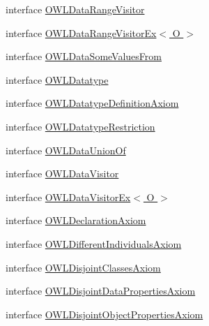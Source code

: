\begin{DoxyCompactItemize}
\item 
interface \hyperlink{interfaceorg_1_1semanticweb_1_1owlapi_1_1model_1_1_o_w_l_data_range_visitor}{O\-W\-L\-Data\-Range\-Visitor}
\item 
interface \hyperlink{interfaceorg_1_1semanticweb_1_1owlapi_1_1model_1_1_o_w_l_data_range_visitor_ex_3_01_o_01_4}{O\-W\-L\-Data\-Range\-Visitor\-Ex$<$ O $>$}
\item 
interface \hyperlink{interfaceorg_1_1semanticweb_1_1owlapi_1_1model_1_1_o_w_l_data_some_values_from}{O\-W\-L\-Data\-Some\-Values\-From}
\item 
interface \hyperlink{interfaceorg_1_1semanticweb_1_1owlapi_1_1model_1_1_o_w_l_datatype}{O\-W\-L\-Datatype}
\item 
interface \hyperlink{interfaceorg_1_1semanticweb_1_1owlapi_1_1model_1_1_o_w_l_datatype_definition_axiom}{O\-W\-L\-Datatype\-Definition\-Axiom}
\item 
interface \hyperlink{interfaceorg_1_1semanticweb_1_1owlapi_1_1model_1_1_o_w_l_datatype_restriction}{O\-W\-L\-Datatype\-Restriction}
\item 
interface \hyperlink{interfaceorg_1_1semanticweb_1_1owlapi_1_1model_1_1_o_w_l_data_union_of}{O\-W\-L\-Data\-Union\-Of}
\item 
interface \hyperlink{interfaceorg_1_1semanticweb_1_1owlapi_1_1model_1_1_o_w_l_data_visitor}{O\-W\-L\-Data\-Visitor}
\item 
interface \hyperlink{interfaceorg_1_1semanticweb_1_1owlapi_1_1model_1_1_o_w_l_data_visitor_ex_3_01_o_01_4}{O\-W\-L\-Data\-Visitor\-Ex$<$ O $>$}
\item 
interface \hyperlink{interfaceorg_1_1semanticweb_1_1owlapi_1_1model_1_1_o_w_l_declaration_axiom}{O\-W\-L\-Declaration\-Axiom}
\item 
interface \hyperlink{interfaceorg_1_1semanticweb_1_1owlapi_1_1model_1_1_o_w_l_different_individuals_axiom}{O\-W\-L\-Different\-Individuals\-Axiom}
\item 
interface \hyperlink{interfaceorg_1_1semanticweb_1_1owlapi_1_1model_1_1_o_w_l_disjoint_classes_axiom}{O\-W\-L\-Disjoint\-Classes\-Axiom}
\item 
interface \hyperlink{interfaceorg_1_1semanticweb_1_1owlapi_1_1model_1_1_o_w_l_disjoint_data_properties_axiom}{O\-W\-L\-Disjoint\-Data\-Properties\-Axiom}
\item 
interface \hyperlink{interfaceorg_1_1semanticweb_1_1owlapi_1_1model_1_1_o_w_l_disjoint_object_properties_axiom}{O\-W\-L\-Disjoint\-Object\-Properties\-Axiom}
\item 

\end{DoxyCompactItemize}
